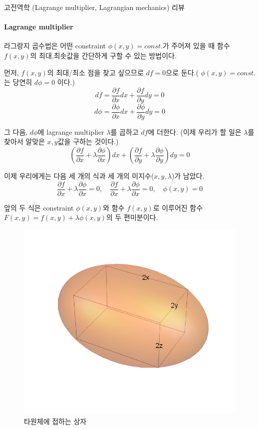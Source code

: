 \documentclass[a4paper,12pt]{article}
\begin{document}
	\begin{flushleft}
	고전역학 (Lagrange multiplier, Lagrangian mechanics) 리뷰
	\end{flushleft}
\paragraph{Lagrange multiplier}
라그랑지 곱수법은 어떤 constraint $\phi(x,y)=const.$가 주어져 있을 때 함수 $f(x,y)$의 최대,최솟값을 간단하게 구할 수 있는 방법이다.
\begin{flushleft}
	먼저, $f(x,y)$의 최대/최소 점을 찾고 싶으므로 $df=0$으로 둔다.( $\phi(x,y)=const.$는 당연히 $d\phi=0$ 이다.)
	$$df=\frac{\partial f}{\partial x}dx+\frac{\partial f}{\partial y}dy=0$$
	$$d\phi=\frac{\partial \phi}{\partial x}dx+\frac{\partial \phi}{\partial y}dy=0$$
\end{flushleft}
\begin{flushleft}
	그 다음, $d\phi$에 lagrange multiplier $\lambda$를 곱하고 $df$에 더한다. (이제 우리가 할 일은 $\lambda$를 찾아서 알맞은 $x,y$값을 구하는 것이다.)
	$$\left(\frac{\partial f}{\partial x}+\lambda \frac{\partial \phi}{\partial x}\right)dx+\left(\frac{\partial f}{\partial y}+\lambda \frac{\partial \phi}{\partial y}\right)dy=0 $$
\end{flushleft}
\begin{flushleft}
	이제 우리에게는 다음 세 개의 식과 세 개의 미지수($x,y,\lambda$)가 남았다.
	$$\frac{\partial f}{\partial x}+\lambda \frac{\partial \phi}{\partial x}=0,\quad\frac{\partial f}{\partial x}+\lambda \frac{\partial \phi}{\partial x}=0,\quad \phi(x,y)=0$$
\end{flushleft}
\begin{flushleft}
	앞의 두 식은 constraint $\phi(x,y)$와 함수 $f(x,y)$로 이루어진 함수 $F(x,y)=f(x,y)+\lambda\phi(x,y)$의 두 편미분이다.  
\end{flushleft}
	\begin{figure}[h]
		\centering
		\includegraphics[width=0.3\columnwidth]{fig1.png}
		\caption{타원체에 접하는 상자}
	\end{figure}\\
\end{document}
